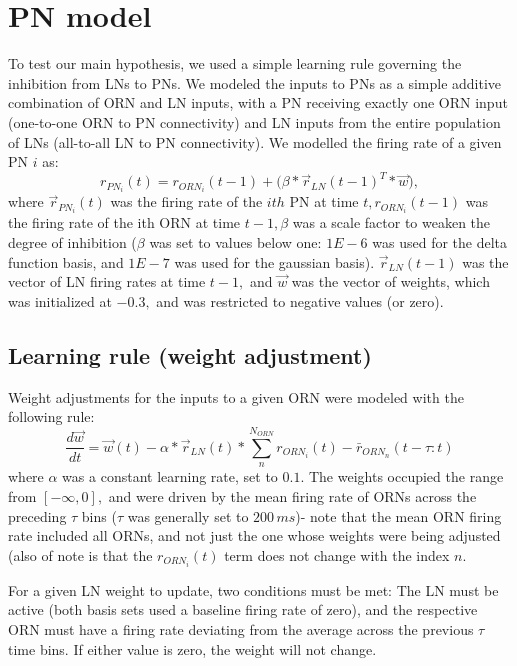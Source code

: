 \documentclass[a4paper,12pt,twoside]{article}
\begin{document}
\section{PN model}
To test our main hypothesis, we used a simple learning rule governing the inhibition from LNs to PNs.  We modeled the inputs to PNs as a simple additive combination of ORN and LN inputs, with a PN receiving exactly one ORN input (one-to-one ORN to PN connectivity) and LN inputs from the entire population of LNs (all-to-all LN to PN connectivity).  We modelled the firing rate of a given PN $i$ as:
\begin{equation}
r_{PN_i}(t) = r_{ORN_i}(t - 1) +  \Big(\beta * \vec{r}_{LN}(t - 1)^T * \vec{w}\Big),
\label{eq:PN}
\end{equation}
where $\vec{r}_{PN_i}(t)$ was the firing rate of the $ ith$ PN at time $ t, r_{ORN_i}(t - 1)$ was the firing rate of the ith ORN at time $t - 1, \beta$ was a scale factor to weaken the degree of inhibition ($\beta$ was set to values below one: $1E-6$ was used for the delta function basis, and $1E-7$ was used for the gaussian basis).  $\vec{r}_{LN}(t - 1)$ was the vector of LN firing rates at time $t - 1,$ and $\vec{w}$ was the vector of weights, which was initialized at $-0.3,$ and was restricted to negative values (or zero).

\subsection{Learning rule (weight adjustment)}
Weight adjustments for the inputs to a given ORN were modeled with the following rule:
\begin{equation}
\frac{d\vec{w}}{dt} = \vec{w}(t) - \alpha * \vec{r}_{LN}(t) * \sum\limits_{n}^{N_{ORN}} r_{ORN_i}(t) - \bar{r}_{ORN_n}(t - \tau : t)
\end{equation}
where $\alpha$ was a constant learning rate, set to $0.1$.  The weights occupied the range from $[-\infty, 0],$ and were driven by the mean firing rate of ORNs across the preceding $\tau$ bins ($\tau$ was generally set to $200 \,ms$)- note that the mean ORN firing rate included all ORNs, and not just the one whose weights were being adjusted (also of note is that the $r_{ORN_i}(t)$ term does not change with the index $n.$  

For a given LN weight to update, two conditions must be met: The LN must be active (both basis sets used a baseline firing rate of zero), and the respective ORN must have a firing rate deviating from the average across the previous $\tau$ time bins.  If either value is zero, the weight will not change.
\end{document}
